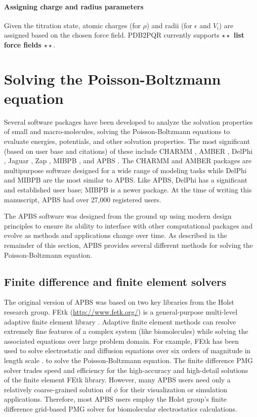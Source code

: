 \documentclass[11pt,titlepage]{article}
\newcommand{\todo}[1]{\textbf{$\star \star$ {#1} $\star \star$}}
\begin{document}
\paragraph{Assigning charge and radius parameters}
Given the titration state, atomic charges (for $\rho$) and radii (for $\epsilon$ and $V_i$) are assigned based on the chosen force field.
PDB2PQR currently supports \todo{list force fields}.

\section{Solving the Poisson-Boltzmann equation}
Several software packages have been developed to analyze the solvation properties of small and macro-molecules, solving the Poisson-Boltzmann equations to evaluate energies, potentials, and other solvation properties.
The most significant (based on user base and citations) of these include CHARMM \cite{Brooks2009}, AMBER \cite{Case2005}, DelPhi \cite{Sarkar2013}, Jaguar \cite{Bochevarov2013}, Zap \cite{Grant2001}, MIBPB \cite{Chen2011}, and APBS \cite{APBS}.
The CHARMM and AMBER packages are multipurpose software designed for a wide range of modeling tasks while DelPhi and MIBPB are the most similar to APBS.
Like APBS, DelPhi has a significant and established user base; MIBPB is a newer package.
At the time of writing this manuscript, APBS had over 27,000 registered users.

The APBS software was designed from the ground up using modern design principles to ensure its ability to interface with other computational packages and evolve as methods and applications change over time.
As described in the remainder of this section, APBS provides several different methods for solving the Poisson-Boltzmann equation.

\subsection{Finite difference and finite element solvers}
The original version of APBS was based on two key libraries from the Holst research group.
FEtk (\url{http://www.fetk.org/}) is a general-purpose multi-level adaptive finite element library \cite{FEtk}.
Adaptive finite element methods can resolve extremely fine features of a complex system (like biomolecules) while solving the associated equations over large problem domain.
For example, FEtk has been used to solve electrostatic and diffusion equations over six orders of magnitude in length scale \cite{Tai}.
\cite{PMG} to solve the Poisson-Boltzmann equation.
The finite difference PMG solver trades speed and efficiency for the high-accuracy and high-detail solutions of the finite element FEtk library.
However, many APBS users need only a relatively coarse-grained solution of $\phi$ for their visualization or simulation applications.
Therefore, most APBS users employ the Holst group's finite difference grid-based PMG solver for biomolecular electrostatics calculations.
\end{document}
